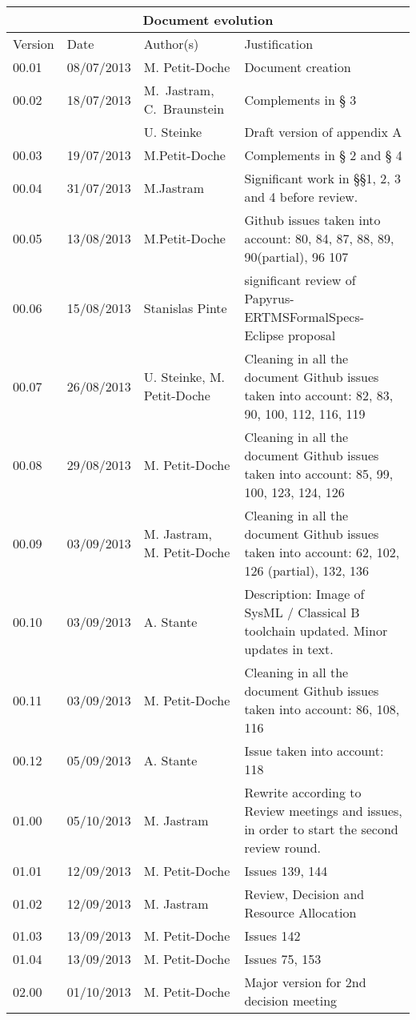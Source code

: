 \documentclass{template/openetcs_report}
\begin{document}
\begin{tabular}{|p{2.2cm}|p{2cm}|p{3cm}|p{5cm}|}
\hline
\multicolumn{4}{|c|}{Document evolution} \\
\hline
Version &  Date & Author(s) & Justification  \\
\hline  
00.01 & 08/07/2013 & M. Petit-Doche &  Document creation  \\
00.02 & 18/07/2013 & M.~Jastram, C.~Braunstein & Complements in § 3 \\
 &  & U. Steinke & Draft version of appendix A \\
00.03 & 19/07/2013 & M.Petit-Doche & Complements in § 2 and § 4 \\
00.04 & 31/07/2013 & M.Jastram & Significant work in §§1, 2, 3 and 4 before review. \\
00.05 & 13/08/2013 & M.Petit-Doche & Github issues taken into account: 80, 84, 87, 88, 89, 90(partial), 96 107 \\
00.06 & 15/08/2013 & Stanislas Pinte & significant review of Papyrus-ERTMSFormalSpecs-Eclipse proposal \\
00.07 & 26/08/2013 & U. Steinke, M. Petit-Doche & Cleaning in all the document Github issues taken into account: 82, 83, 90, 100, 112, 116, 119 \\
00.08 & 29/08/2013 &  M. Petit-Doche & Cleaning in all the document Github issues taken into account: 85, 99, 100, 123, 124, 126 \\
00.09 & 03/09/2013 & M. Jastram,  M. Petit-Doche & Cleaning in all the document Github issues taken into account: 62, 102, 126 (partial), 132, 136 \\
00.10 & 03/09/2013 & A. Stante & Description: Image of SysML / Classical B toolchain updated. Minor updates in text. \\
00.11 & 03/09/2013 &  M. Petit-Doche & Cleaning in all the document Github issues taken into account: 86, 108, 116 \\
00.12 & 05/09/2013 &  A. Stante & Issue taken into account: 118 \\
01.00 & 05/10/2013 &  M. Jastram & Rewrite according to Review meetings and issues, in order to start the second review round. \\
01.01 & 12/09/2013 &  M. Petit-Doche & Issues 139, 144  \\
01.02 & 12/09/2013 &  M. Jastram & Review, Decision and Resource Allocation \\
01.03 & 13/09/2013 &  M. Petit-Doche & Issues 142  \\
01.04 & 13/09/2013 &  M. Petit-Doche & Issues 75, 153  \\
02.00 & 01/10/2013 &  M. Petit-Doche & Major version for 2nd decision meeting  \\
\hline  
\end{tabular}
\end{document}
